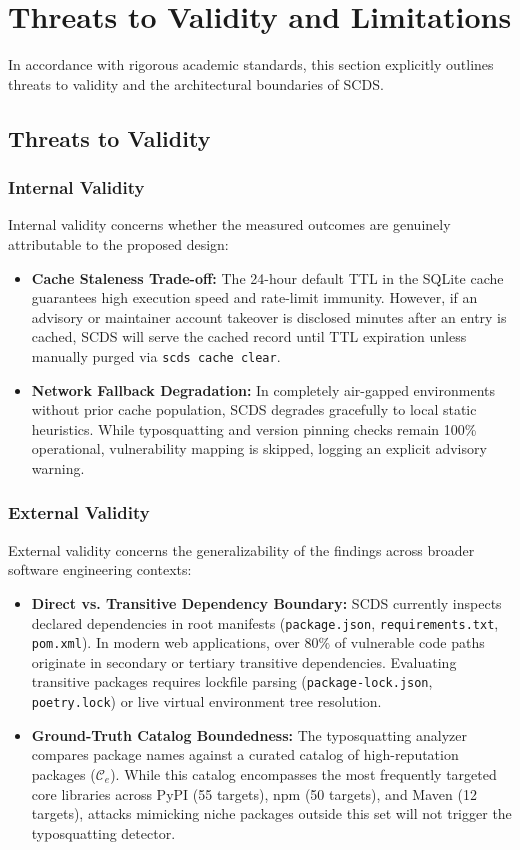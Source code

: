 \section{Threats to Validity and Limitations}
\label{sec:limitations}

In accordance with rigorous academic standards, this section explicitly outlines threats to validity and the architectural boundaries of SCDS.

\subsection{Threats to Validity}

\subsubsection{Internal Validity}
Internal validity concerns whether the measured outcomes are genuinely attributable to the proposed design:
\begin{itemize}
    \item \textbf{Cache Staleness Trade-off:} The 24-hour default TTL in the SQLite cache guarantees high execution speed and rate-limit immunity. However, if an advisory or maintainer account takeover is disclosed minutes after an entry is cached, SCDS will serve the cached record until TTL expiration unless manually purged via \texttt{scds cache clear}.
    \item \textbf{Network Fallback Degradation:} In completely air-gapped environments without prior cache population, SCDS degrades gracefully to local static heuristics. While typosquatting and version pinning checks remain 100\% operational, vulnerability mapping is skipped, logging an explicit advisory warning.
\end{itemize}

\subsubsection{External Validity}
External validity concerns the generalizability of the findings across broader software engineering contexts:
\begin{itemize}
    \item \textbf{Direct vs. Transitive Dependency Boundary:} SCDS currently inspects declared dependencies in root manifests (\texttt{package.json}, \texttt{requirements.txt}, \texttt{pom.xml}). In modern web applications, over $80\%$ of vulnerable code paths originate in secondary or tertiary transitive dependencies. Evaluating transitive packages requires lockfile parsing (\texttt{package-lock.json}, \texttt{poetry.lock}) or live virtual environment tree resolution.
    \item \textbf{Ground-Truth Catalog Boundedness:} The typosquatting analyzer compares package names against a curated catalog of high-reputation packages ($\mathcal{C}_e$). While this catalog encompasses the most frequently targeted core libraries across PyPI (55 targets), npm (50 targets), and Maven (12 targets), attacks mimicking niche packages outside this set will not trigger the typosquatting detector.
\end{itemize}

